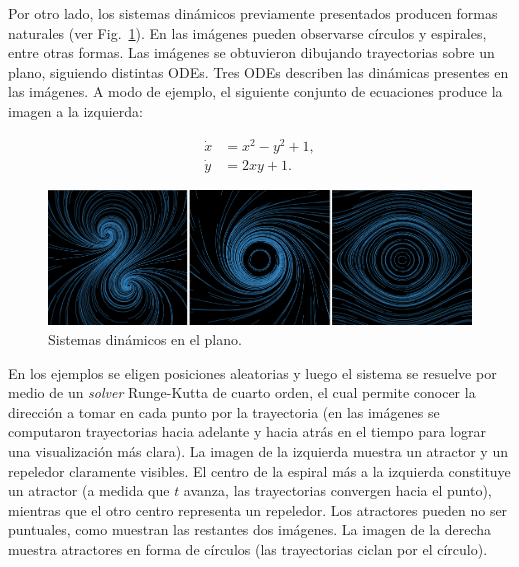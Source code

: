 
Por otro lado, los sistemas din\'amicos previamente presentados producen formas naturales (ver Fig.~\ref{fg:sistdin2}).
En las im\'agenes pueden observarse c\'irculos y espirales, entre otras formas.
Las im\'agenes se obtuvieron dibujando trayectorias sobre un plano, siguiendo distintas ODEs.
Tres ODEs describen las din\'amicas presentes en las im\'agenes.
A modo de ejemplo, el siguiente conjunto de ecuaciones produce la imagen a la izquierda:

\begin{equation} \label{eq:simple}  
  \begin{aligned}
    \dot{x} &= x^{2}-y^{2}+1,\\
    \dot{y} &= 2xy+1.
  \end{aligned}
\end{equation}


\begin{figure}[htb!]
  \centerline{\includegraphics[width=13cm]{figures/sistdin2}}
  \caption{Sistemas dinámicos en el plano.}
  \label{fg:sistdin2}
\end{figure}

En los ejemplos se eligen posiciones aleatorias y luego el sistema se resuelve por medio de un {\em solver} Runge-Kutta de cuarto orden, el cual permite conocer la direcci\'on a tomar en cada punto por la trayectoria (en las im\'agenes se computaron trayectorias hacia adelante y hacia atrás en el tiempo para lograr una visualizaci\'on más clara).
La imagen de la izquierda muestra un atractor y un repeledor claramente visibles.
El centro de la espiral m\'as a la izquierda constituye un atractor (a medida que $t$ avanza, las trayectorias convergen hacia el punto), mientras que el otro centro representa un repeledor.
Los atractores pueden no ser puntuales, como muestran las restantes dos im\'agenes.
La imagen de la derecha muestra atractores en forma de c\'irculos (las trayectorias ciclan por el c\'irculo).

